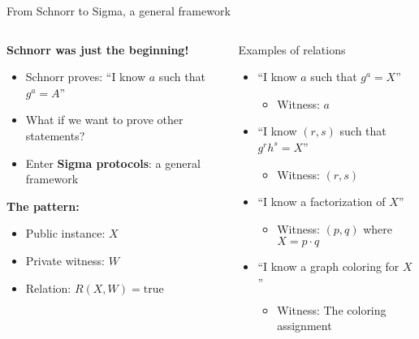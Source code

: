 \documentclass[aspectratio=169, lualatex, handout]{beamer}
\begin{document}
\begin{frame}{From Schnorr to Sigma, a general framework}
	\begin{columns}[c]
		\begin{column}{0.5\textwidth}
			\textbf{Schnorr was just the beginning!}
			\begin{itemize}
				\item Schnorr proves: ``I know $a$ such that $g^a = A$''
				\item What if we want to prove other statements?
				\item Enter \textbf{Sigma protocols}: a general framework
			\end{itemize}
			\vspace{0.5em}
			\textbf{The pattern:}
			\begin{itemize}
				\item Public instance: $X$
				\item Private witness: $W$
				\item Relation: $R(X, W) = \text{true}$
			\end{itemize}
		\end{column}
		\begin{column}{0.5\textwidth}
			\begin{exampleblock}{Examples of relations}
				\begin{itemize}
					\item ``I know $a$ such that $g^a = X$''
					      \begin{itemize}
						      \item Witness: $a$
					      \end{itemize}
					\item ``I know $(r, s)$ such that $g^r h^s = X$''
					      \begin{itemize}
						      \item Witness: $(r, s)$
					      \end{itemize}
					\item ``I know a factorization of $X$''
					      \begin{itemize}
						      \item Witness: $(p, q)$ where $X = p \cdot q$
					      \end{itemize}
					\item ``I know a graph coloring for $X$''
					      \begin{itemize}
						      \item Witness: The coloring assignment
					      \end{itemize}
				\end{itemize}
			\end{exampleblock}
		\end{column}
	\end{columns}
\end{frame}
\end{document}
